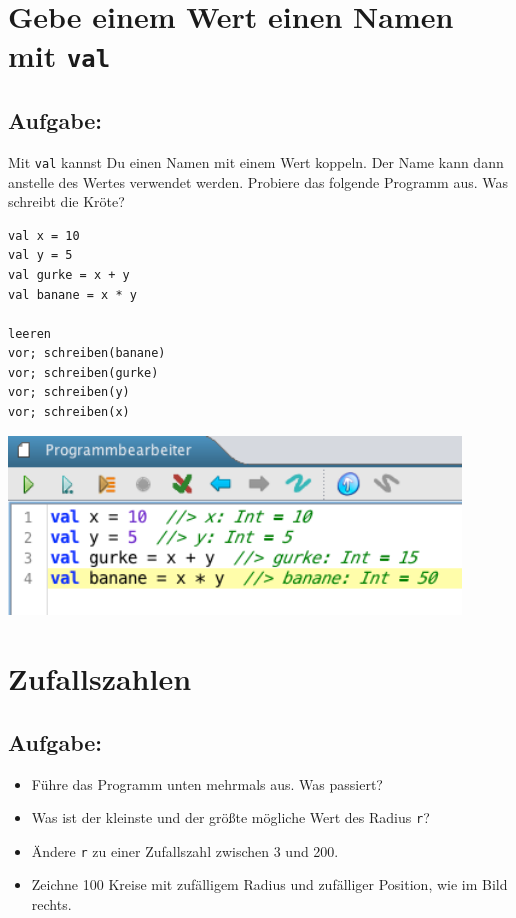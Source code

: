 \chapter{Gebe einem Wert einen Namen mit \lstinline{val}}
\begin{multicols}{2}
\section*{\color{BrickRed}Aufgabe:}
Mit \lstinline{val} kannst Du einen Namen mit einem Wert koppeln. Der Name kann dann anstelle des Wertes verwendet werden. Probiere das folgende Programm aus. Was schreibt die Kröte?

\begin{lstlisting}[numbers=none]
val x = 10
val y = 5
val gurke = x + y
val banane = x * y

leeren
vor; schreiben(banane)
vor; schreiben(gurke)
vor; schreiben(y)
vor; schreiben(x)
\end{lstlisting}
        

\columnbreak

\begin{center}
\includegraphics[width=12.0cm]{../img/val_de.png}
\end{center}

\end{multicols}

\chapter{Zufallszahlen}\section*{\color{BrickRed}Aufgabe:}


\begin{itemize}

\item {Führe das Programm unten mehrmals aus. Was passiert?}
\item {Was ist der kleinste und der größte mögliche Wert des Radius \lstinline{r}?}
\item {Ändere \lstinline{r} zu einer Zufallszahl zwischen 3 und 200.}
\item {Zeichne 100 Kreise mit zufälligem Radius und zufälliger Position, wie im Bild rechts.}

\end{itemize}



